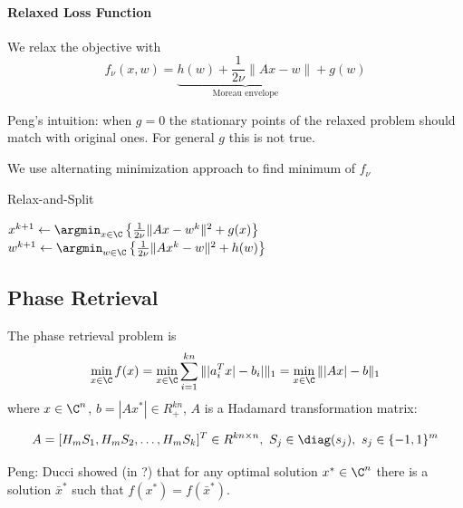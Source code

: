 \documentclass[11pt,letterpaper]{article}
\numberwithin{equation}{section} %
\numberwithin{figure}{section} %
\numberwithin{table}{section} %
\begin{document}
    \paragraph{Relaxed Loss Function}
    We relax the objective with 
    \[
        f_{\nu}(x, w) = \underbrace{h(w) + \frac{1}{2\nu}\|Ax - w\|}_{\text{Moreau envelope}} + g(w)
    \]
    
    \begin{tip} Peng's intuition: when $g = 0$ the stationary points of the relaxed problem should match with original ones. For general $g$ this is not true. 
    \end{tip}

    
    We use alternating minimization approach to find minimum of $f_{\nu}$
    
    \begin{algorithm}
        \caption{Relax-and-Split \cite{Zheng2018RelaxAndSplit}}
        \label{alg:relax-and-split}
        \begin{algorithmic}[1]
            \State $x^{k+1} \gets \argmin_{x \in \C} \left\{\frac{1}{2\nu}\|Ax - w^k\|^2 + g(x)\right\}$
            \State $w^{k+1} \gets \argmin_{w \in \C} \left\{\frac{1}{2\nu}\|Ax^k - w\|^2 + h(w)\right\} $
        \end{algorithmic}
    \end{algorithm}

    
\subsection*{Phase Retrieval} 

The phase retrieval problem is 
\[
    \min_{x \in \C} f(x) = \min_{x \in \C} \sum_{i = 1}^{kn} \||a_i^Tx| - b_i|\|_1 = \min_{x \in \C}\||Ax| - b\|_1 
\]
where $x \in \C^n$, $b = |Ax^*| \in R^{kn}_+$, $A$ is a Hadamard transformation matrix:

\[
    A = [H_mS_1, H_mS_2, \dots, H_mS_k]^T \in R^{kn\times n} ,\ S_j \in \diag(s_j), \ s_j \in \{-1, 1\}^m
\]

\begin{tip}
Peng: Ducci showed (in \cite{Duchi2017PhaseRetrival}?) that for any optimal solution $x^* \in \C^n$ there is a solution $\bar{x}^*$ such that $f(x^*) = f(\bar{x}^*)$.  
\end{tip}
\end{document}
